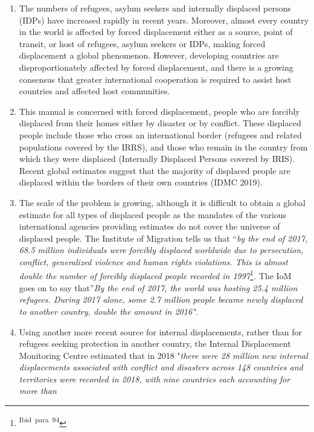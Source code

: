 \documentclass[
]{article}
\begin{document}
\begin{enumerate}
\def\labelenumi{\arabic{enumi}.}
\setcounter{enumi}{10}
\item
  The numbers of refugees, asylum seekers and internally displaced
  persons (IDPs) have increased rapidly in recent years. Moreover,
  almost every country in the world is affected by forced displacement
  either as a source, point of transit, or host of refugees, asylum
  seekers or IDPs, making forced displacement a global phenomenon.
  However, developing countries are disproportionately affected by
  forced displacement, and there is a growing consensus that greater
  international cooperation is required to assist host countries and
  affected host communities.
\item
  This manual is concerned with forced displacement, people who are
  forcibly displaced from their homes either by disaster or by
  conflict. These displaced people include those who cross an
  international border (refugees and related populations covered by
  the IRRS), and those who remain in the country from which they were
  displaced (Internally Displaced Persons covered by IRIS). Recent
  global estimates suggest that the majority of displaced people are
  displaced within the borders of their own countries (IDMC 2019).
\item
  The scale of the problem is growing, although it is difficult to
  obtain a global estimate for all types of displaced people as the
  mandates of the various international agencies providing estimates
  do not cover the universe of displaced people. The Institute of
  Migration tells us that ``\emph{by the end of 2017, 68.5 million
  individuals were forcibly displaced worldwide due to persecution,
  conflict, generalized violence and human rights violations. This is
  almost double the number of forcibly displaced people recorded in
  1997}\footnote{\textsuperscript{Ibid~para~94}}\emph{.} The IoM goes on to say that''\emph{By the end of 2017, the
  world was hosting 25.4 million refugees. During 2017 alone, some 2.7
  million people became newly displaced to another country, double the
  amount in 2016".}
\item
  Using another more recent source for internal displacements, rather
  than for refugees seeking protection in another country, the
  Internal Displacement Monitoring Centre estimated that in 2018
  "\emph{there were 28 million new internal displacements associated with
  conflict and disasters across 148 countries and territories were
  recorded in 2018, with nine countries each accounting for more than
}
\end{enumerate}
\end{document}
